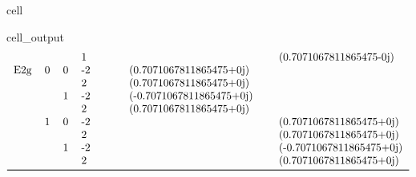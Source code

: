 \documentclass[letterpaper,table,10pt,english]{jupyterBook}
\begin{document}
\begin{sphinxuseclass}{cell}
\begin{sphinxVerbatimOutput}
\begin{sphinxuseclass}{cell_output}
\begin{equation*}
\begin{split}
\begin{tabular}{lllllllll}
    &   &   &  1 &         &   &                           &   &   (0.7071067811865475-0j) \\
E2g & 0 & 0 & -2 &         &   &   (0.7071067811865475+0j) &   &                           \\
    &   &   &  2 &         &   &   (0.7071067811865475+0j) &   &                           \\
    &   & 1 & -2 &         &   &  (-0.7071067811865475+0j) &   &                           \\
    &   &   &  2 &         &   &   (0.7071067811865475+0j) &   &                           \\
    & 1 & 0 & -2 &         &   &                           &   &   (0.7071067811865475+0j) \\
    &   &   &  2 &         &   &                           &   &   (0.7071067811865475+0j) \\
    &   & 1 & -2 &         &   &                           &   &  (-0.7071067811865475+0j) \\
    &   &   &  2 &         &   &                           &   &   (0.7071067811865475+0j) \\
\bottomrule
\end{tabular}\end{split}
\end{equation*}
\end{sphinxuseclass}\end{sphinxVerbatimOutput}

\end{sphinxuseclass}
\end{document}
